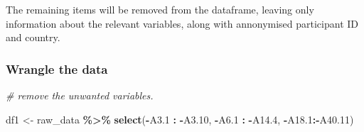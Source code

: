 \documentclass[
]{article}
\newenvironment{Shaded}{\begin{snugshade}}{\end{snugshade}}
\newcommand{\CommentTok}[1]{\textcolor[rgb]{0.56,0.35,0.01}{\textit{#1}}}
\newcommand{\FloatTok}[1]{\textcolor[rgb]{0.00,0.00,0.81}{#1}}
\newcommand{\FunctionTok}[1]{\textcolor[rgb]{0.13,0.29,0.53}{\textbf{#1}}}
\newcommand{\NormalTok}[1]{#1}
\newcommand{\OtherTok}[1]{\textcolor[rgb]{0.56,0.35,0.01}{#1}}
\newcommand{\SpecialCharTok}[1]{\textcolor[rgb]{0.81,0.36,0.00}{\textbf{#1}}}
\begin{document}
The remaining items will be removed from the dataframe, leaving only
information about the relevant variables, along with annonymised
participant ID and country.

\subsubsection{Wrangle the data}\label{wrangle-the-data}

\begin{Shaded}
\begin{Highlighting}[]
\CommentTok{\# remove the unwanted variables. }

\NormalTok{df1 }\OtherTok{\textless{}{-}}\NormalTok{ raw\_data }\SpecialCharTok{\%\textgreater{}\%} 
  \FunctionTok{select}\NormalTok{(}\SpecialCharTok{{-}}\NormalTok{A3}\FloatTok{.1} \SpecialCharTok{:} \SpecialCharTok{{-}}\NormalTok{A3}\FloatTok{.10}\NormalTok{, }\SpecialCharTok{{-}}\NormalTok{A6}\FloatTok{.1} \SpecialCharTok{:} \SpecialCharTok{{-}}\NormalTok{A14}\FloatTok{.4}\NormalTok{, }\SpecialCharTok{{-}}\NormalTok{A18}\FloatTok{.1}\SpecialCharTok{:{-}}\NormalTok{A40}\FloatTok{.11}\NormalTok{)}
\end{Highlighting}
\end{Shaded}
\end{document}
